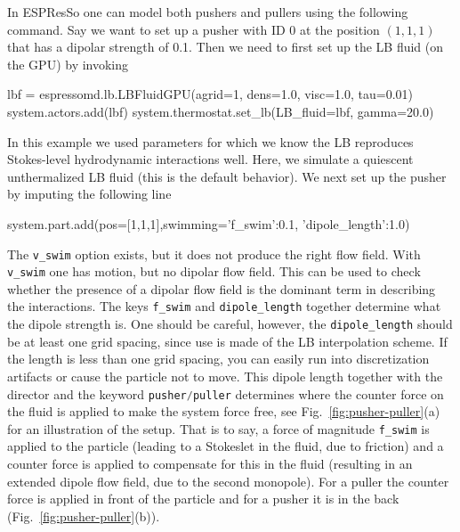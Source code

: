 \documentclass[aip,jcp,reprint,a4paper,onecolumn,amsmath]{revtex4-1}
\newcommand{\es}{\mbox{\textsf{ESPResSo}}\xspace}
\newcommand\codees{\lstinline[language=python]}
\begin{document}
In \es{} one can model both pushers and pullers using the following command.
Say we want to set up a pusher with ID 0 at the position $(1,1,1)$ that has a
dipolar strength of 0.1. Then we need to first set up the LB fluid (on the GPU)
by invoking
\begin{espresso}
lbf = espressomd.lb.LBFluidGPU(agrid=1, dens=1.0, visc=1.0, tau=0.01)
system.actors.add(lbf)
system.thermostat.set_lb(LB_fluid=lbf, gamma=20.0)
\end{espresso}
In this example we used parameters for which we know the LB reproduces
Stokes-level hydrodynamic interactions well. Here, we simulate a
quiescent unthermalized LB fluid (this is the default
behavior). We next set up the pusher by imputing the following line
\begin{espresso}
system.part.add(pos=[1,1,1],swimming={'f_swim':0.1, 'dipole_length':1.0})
\end{espresso}
The \codees{v_swim} option exists, but it does not produce the right flow
field. With \codees{v_swim} one has motion, but no dipolar flow field. This can
be used to check whether the presence of a dipolar flow field is the dominant
term in describing the interactions. The keys \codees{f_swim} and
\codees{dipole_length} together determine what the dipole strength is. One
should be careful, however, the \codees{dipole_length} should be at least one
grid spacing, since use is made of the LB interpolation scheme. If the length
is less than one grid spacing, you can easily run into discretization artifacts
or cause the particle not to move. This dipole length together with the
director and the keyword \codees{pusher/puller} determines where the counter
force on the fluid is applied to make the system force free, see
Fig.~\ref{fig:pusher-puller}(a) for an illustration of the setup. That is to
say, a force of magnitude \codees{f_swim} is applied to the particle (leading
to a Stokeslet in the fluid, due to friction) and a counter force is applied to
compensate for this in the fluid (resulting in an extended dipole flow field,
due to the second monopole). For a puller the counter force is applied in front
of the particle and for a pusher it is in the back
(Fig.~\ref{fig:pusher-puller}(b)).
\end{document}
